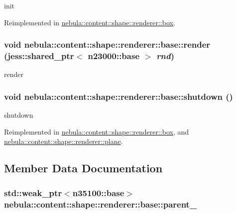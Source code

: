 init 

Reimplemented in \hyperlink{classnebula_1_1content_1_1shape_1_1renderer_1_1box_a03626525c89e34ff6616512050c66ac8}{nebula::content::shape::renderer::box}.\hypertarget{classnebula_1_1content_1_1shape_1_1renderer_1_1base_ae34770ec8371ffd3d62cee52f5b72f85}{
\subsubsection[{render}]{\setlength{\rightskip}{0pt plus 5cm}void nebula::content::shape::renderer::base::render (jess::shared\_\-ptr$<$ {\bf n23000::base} $>$ {\em rnd})}}
\label{classnebula_1_1content_1_1shape_1_1renderer_1_1base_ae34770ec8371ffd3d62cee52f5b72f85}


render \hypertarget{classnebula_1_1content_1_1shape_1_1renderer_1_1base_a3e5311f8c103a0ae28e20c4145737cf8}{
\subsubsection[{shutdown}]{\setlength{\rightskip}{0pt plus 5cm}void nebula::content::shape::renderer::base::shutdown ()}}
\label{classnebula_1_1content_1_1shape_1_1renderer_1_1base_a3e5311f8c103a0ae28e20c4145737cf8}


shutdown 

Reimplemented in \hyperlink{classnebula_1_1content_1_1shape_1_1renderer_1_1box_a06588ac2d7fd76ec8589aaeab56b6389}{nebula::content::shape::renderer::box}, and \hyperlink{classnebula_1_1content_1_1shape_1_1renderer_1_1plane_ae5a310f6e36f4798770fae0aec97d20c}{nebula::content::shape::renderer::plane}.

\subsection{Member Data Documentation}
\hypertarget{classnebula_1_1content_1_1shape_1_1renderer_1_1base_a1e9244bd3fd366195582985ac79e2701}{
\subsubsection[{parent\_\-}]{\setlength{\rightskip}{0pt plus 5cm}std::weak\_\-ptr$<${\bf n35100::base}$>$ {\bf nebula::content::shape::renderer::base::parent\_\-}}}
\label{classnebula_1_1content_1_1shape_1_1renderer_1_1base_a1e9244bd3fd366195582985ac79e2701}


